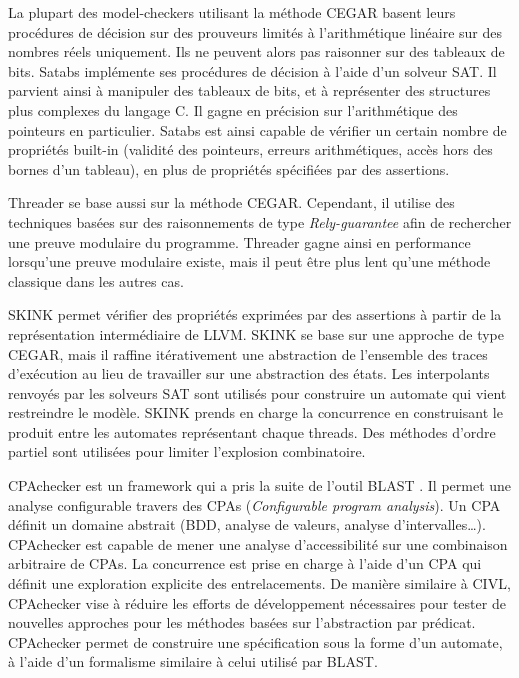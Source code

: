 La plupart des model-checkers utilisant la méthode \ac{CEGAR} basent leurs procédures
de décision sur des prouveurs limités à l'arithmétique linéaire sur des nombres
réels uniquement. Ils ne peuvent alors pas raisonner sur des tableaux de bits.
Satabs\cite{Satabs}\cite{clarkesatabs} implémente ses procédures de décision à
l'aide d'un solveur SAT. Il parvient ainsi à manipuler des tableaux de bits, et
à représenter des structures plus complexes du langage C. Il gagne en précision
sur l'arithmétique des pointeurs en particulier. Satabs est ainsi capable de
vérifier un certain nombre de propriétés built-in (validité des pointeurs,
erreurs arithmétiques, accès hors des bornes d'un tableau), en plus de
propriétés spécifiées par des assertions.

Threader\cite{Threader}\cite{Threader_theory} se base aussi sur la méthode
\ac{CEGAR}. Cependant, il utilise des techniques basées sur des raisonnements de type
\emph{Rely-guarantee} afin de rechercher une preuve modulaire du programme.
Threader gagne ainsi en performance lorsqu'une preuve modulaire existe, mais
il peut être plus lent qu'une méthode classique dans les autres cas.

SKINK\cite{SKINK} permet vérifier des propriétés exprimées par des assertions à
partir de la représentation intermédiaire de LLVM. SKINK se base sur une
approche de type CEGAR, mais il raffine itérativement une abstraction de
l'ensemble des traces d'exécution au lieu de travailler sur une abstraction des
états. Les interpolants renvoyés par les solveurs SAT sont utilisés pour
construire un automate qui vient restreindre le modèle. SKINK prends en charge
la concurrence en construisant le produit entre les automates représentant
chaque threads. Des méthodes d'ordre partiel sont utilisées pour limiter
l'explosion combinatoire.

CPAchecker\cite{CPAChecker} est un framework qui a pris la suite de l'outil
BLAST \cite{BLAST}. Il permet une analyse configurable travers des CPAs
(\emph{Configurable program analysis}). Un CPA définit un domaine abstrait
(\ac{BDD}, analyse de valeurs, analyse d'intervalles\dots). CPAchecker est capable
de mener une analyse d'accessibilité sur une combinaison arbitraire de CPAs. La
concurrence est prise en charge à l'aide d'un CPA qui définit une exploration
explicite des entrelacements\cite{CPAChecker_multithread}. De manière similaire
à CIVL, CPAchecker vise à réduire les efforts de développement nécessaires pour
tester de nouvelles approches pour les méthodes basées sur l'abstraction par
prédicat. CPAchecker permet de construire une spécification sous la forme d'un
automate, à l'aide d'un formalisme similaire à celui utilisé par BLAST.

